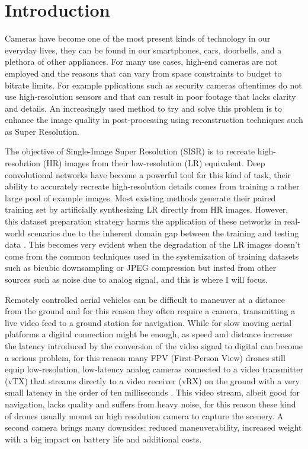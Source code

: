 \chapter{Introduction}
\label{cha:introduction}

Cameras have become one of the most present kinds of technology in our everyday lives, they can be found in our smartphones, cars, doorbells, and a plethora of other appliances. For many use cases, high-end cameras are not employed and the reasons that can vary from space constraints to budget to bitrate limits. For example pplications such as security cameras oftentimes do not use high-resolution sensors and that can result in poor footage that lacks clarity and details. An increasingly used method to try and solve this problem is to enhance the image quality in post-processing using reconstruction techniques such as Super Resolution.

The objective of Single-Image Super Resolution (SISR) is to recreate high-resolution (HR) images from their low-resolution (LR) equivalent.
Deep convolutional networks have become a powerful tool for this kind of task, their ability to accurately recreate high-resolution details comes from training a rather large pool of example images.
Most existing methods generate their paired training set by artificially synthesizing LR directly from HR images. However, this dataset preparation strategy harms the application of these networks in real-world scenarios due to the inherent domain gap between the training and testing data \cite{9711325}.
This becomes very evident when the degradation of the LR images doesn't come from the common techniques used in the systemization of training datasets such as bicubic downsampling or JPEG compression but insted from other sources such as noise due to analog signal, and this is where I will focus.

Remotely controlled aerial vehicles can be difficult to maneuver at a distance from the ground and for this reason they often require a camera, transmitting a live video feed to a ground station for navigation. While for slow moving aerial platforms a digital connection might be enough, as speed and distance increase the latency introduced by the conversion of the video signal to digital can become a serious problem, for this reason many FPV (First-Person View) drones still equip low-resolution, low-latency analog cameras connected to a video transmitter (vTX) that streams directly to a video receiver (vRX) on the ground with a very small latency in the order of ten milliseconds \cite{oscar}. This video stream, albeit good for navigation, lacks quality and suffers from heavy noise, for this reason these kind of drones usually mount an high resolution camera to capture the scenery. A second camera brings many downsides: reduced maneuverability, increased weight with a big impact on battery life and additional costs.

